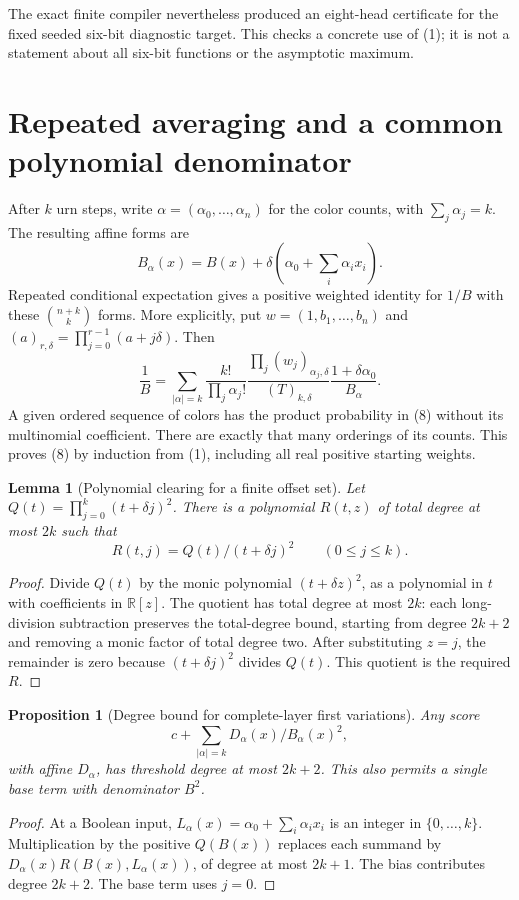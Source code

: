\documentclass[11pt]{article}
\newtheorem{lemma}[theorem]{Lemma}
\newtheorem{proposition}[theorem]{Proposition}
\begin{document}
The exact finite compiler nevertheless produced an eight-head
certificate for the fixed seeded six-bit diagnostic target.
This checks a concrete use of (1); it is not a statement about all
six-bit functions or the asymptotic maximum.

\section{Repeated averaging and a common polynomial denominator}

After $k$ urn steps, write $\alpha=(\alpha_0,\ldots,\alpha_n)$ for
the color counts, with $\sum_j\alpha_j=k$. The resulting affine
forms are
\[
 B_\alpha(x)=B(x)+\delta\left(\alpha_0+\sum_i\alpha_i x_i\right).
 \tag{7}
\]
Repeated conditional expectation gives a positive weighted identity
for $1/B$ with these $\binom{n+k}{k}$ forms. More explicitly, put
$w=(1,b_1,\ldots,b_n)$ and
$(a)_{r,\delta}=\prod_{j=0}^{r-1}(a+j\delta)$. Then
\[
 \frac1B=\sum_{|\alpha|=k}
 \frac{k!}{\prod_j\alpha_j!}
 \frac{\prod_j(w_j)_{\alpha_j,\delta}}{(T)_{k,\delta}}
 \frac{1+\delta\alpha_0}{B_\alpha}.
 \tag{8}
\]
A given ordered sequence of colors has the product probability in
(8) without its multinomial coefficient. There are exactly that
many orderings of its counts. This proves (8) by induction from
(1), including all real positive starting weights.

\begin{lemma}[Polynomial clearing for a finite offset set]
Let $Q(t)=\prod_{j=0}^k(t+\delta j)^2$. There is a polynomial
$R(t,z)$ of total degree at most $2k$ such that
\[
       R(t,j)=Q(t)/(t+\delta j)^2\qquad(0\le j\le k).
\]
\end{lemma}
\begin{proof}
Divide $Q(t)$ by the monic polynomial $(t+\delta z)^2$, as a
polynomial in $t$ with coefficients in $\mathbb R[z]$. The quotient
has total degree at most $2k$: each long-division subtraction preserves
the total-degree bound, starting from degree $2k+2$ and removing a
monic factor of total degree two. After substituting $z=j$, the
remainder is zero because $(t+\delta j)^2$ divides $Q(t)$.
This quotient is the required $R$.
\end{proof}

\begin{proposition}[Degree bound for complete-layer first variations]
Any score
\[
                   c+\sum_{|\alpha|=k} D_\alpha(x)/B_\alpha(x)^2,
\]
with affine $D_\alpha$, has threshold degree at most $2k+2$.
This also permits a single base term with denominator $B^2$.
\end{proposition}
\begin{proof}
At a Boolean input,
$L_\alpha(x)=\alpha_0+\sum_i\alpha_i x_i$ is an integer in
$\{0,\ldots,k\}$. Multiplication by the positive $Q(B(x))$
replaces each summand by
$D_\alpha(x)R(B(x),L_\alpha(x))$, of degree at most $2k+1$.
The bias contributes degree $2k+2$. The base term uses $j=0$.
\end{proof}
\end{document}
